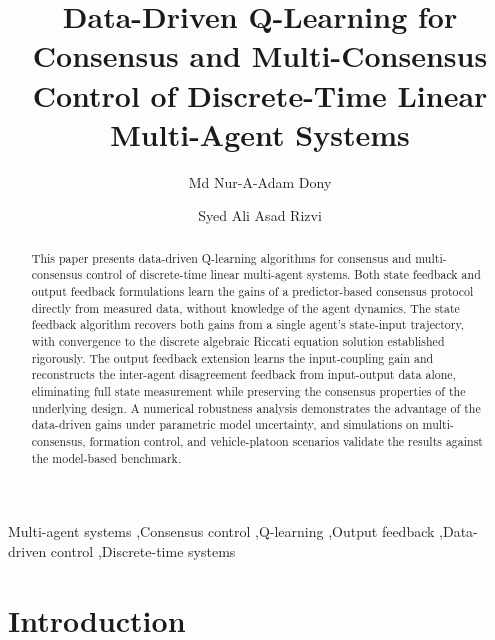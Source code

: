 \documentclass[12pt]{elsarticle}
\theoremstyle{remark}
\begin{document}
\begin{frontmatter}

\title{Data-Driven Q-Learning for Consensus and Multi-Consensus Control of Discrete-Time Linear Multi-Agent Systems}

\author[ttu]{Md Nur-A-Adam Dony}

\author[ttu]{Syed Ali Asad Rizvi}


\begin{abstract}
This paper presents data-driven Q-learning algorithms for consensus and multi-consensus control of discrete-time linear multi-agent systems. Both state feedback and output feedback formulations learn the gains of a predictor-based consensus protocol directly from measured data, without knowledge of the agent dynamics. The state feedback algorithm recovers both gains from a single agent's state-input trajectory, with convergence to the discrete algebraic Riccati equation solution established rigorously. The output feedback extension learns the input-coupling gain and reconstructs the inter-agent disagreement feedback from input-output data alone, eliminating full state measurement while preserving the consensus properties of the underlying design. A numerical robustness analysis demonstrates the advantage of the data-driven gains under parametric model uncertainty, and simulations on multi-consensus, formation control, and vehicle-platoon scenarios validate the results against the model-based benchmark.
\end{abstract}

\begin{keyword}
Multi-agent systems \sep Consensus control \sep Q-learning \sep Output feedback \sep Data-driven control \sep Discrete-time systems
\end{keyword}

\end{frontmatter}

\section{Introduction}
\label{sec:intro}
\end{document}
